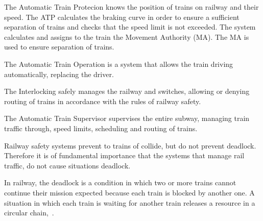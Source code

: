 \documentclass{ewic}
\begin{document}
			The Automatic Train Protecion knows the position of trains on railway and their speed. The ATP calculates the braking curve in order to ensure a sufficient separation of trains and checks that the speed limit is not exceeded. The system calculates and assigns to the train the Movement Authority (MA). %
			The MA is used to ensure separation of trains.
			 
			 
			The Automatic Train Operation is a system that allows the train driving automatically, replacing the driver.
			 
			
			The Interlocking safely manages the railway and switches, allowing or denying routing of trains in accordance with the rules of railway safety.
			
			The Automatic Train Supervisor supervises the entire subway, managing train traffic through, speed limits, scheduling and routing of trains.
			
			Railway safety systems prevent to trains of collide, but do not prevent deadlock. Therefore it is of fundamental importance that the systems that manage rail traffic, do not cause situations deadlock.
			
			In railway, the deadlock is a condition in which two or more trains cannot  continue their mission expected because each train is blocked by another one.
			A situation in which each train is waiting for another train releases a resource in a circular chain,~\cite{Pachl2012}.
			
\end{document}
